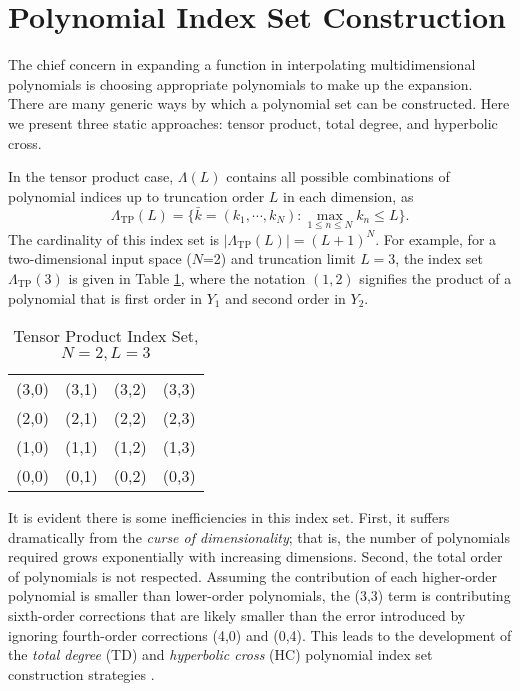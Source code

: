 \section{Polynomial Index Set Construction}\label{sec:index sets}
The chief concern in expanding a function in interpolating multidimensional polynomials is choosing appropriate polynomials to
make up the expansion.
There are many generic ways by which a polynomial set can be constructed.  Here we present three static
approaches: tensor
product, total degree, and hyperbolic cross.

In the tensor
product case, $\Lambda(L)$ contains all possible combinations of polynomial indices up to truncation order $L$ in each
dimension, as
\begin{equation}
  \Lambda_\text{TP}(L)=\Big\{\bar k=(k_1,\cdots,k_N): \max_{1\leq n\leq N}k_n\leq L \Big\}.
\end{equation}
The cardinality of this index set is $|\Lambda_\text{TP}(L)|=(L+1)^N$. For example, for a two-dimensional
input space ($N$=2) and truncation limit $L=3$, the index set $\Lambda_\text{TP}(3)$ is given in Table
\ref{tab:TP}, where the notation $(1,2)$ signifies the product of a polynomial that is first order in $Y_1$
and second order in $Y_2$.

\begin{table}[h]
  \centering
  \begin{tabular}{c c c c}
    (3,0) & (3,1) & (3,2) & (3,3) \\
    (2,0) & (2,1) & (2,2) & (2,3) \\
    (1,0) & (1,1) & (1,2) & (1,3) \\
    (0,0) & (0,1) & (0,2) & (0,3)
  \end{tabular}
  \caption{Tensor Product Index Set, $N=2,L=3$}
  \label{tab:TP}
\end{table}

It is evident there is some inefficiencies in this index set.  First, it suffers dramatically from the
\emph{curse of dimensionality}; that is, the number of polynomials required grows exponentially with
increasing dimensions.  Second, the total order of polynomials is not respected.  Assuming the contribution of
each higher-order polynomial is smaller than lower-order polynomials, the (3,3) term is
contributing sixth-order corrections that are likely smaller than the error introduced by ignoring
fourth-order corrections (4,0) and (0,4).  This leads to the development of the \emph{total degree} (TD) and
\emph{hyperbolic cross} (HC) polynomial index set construction strategies \cite{hctd}.

